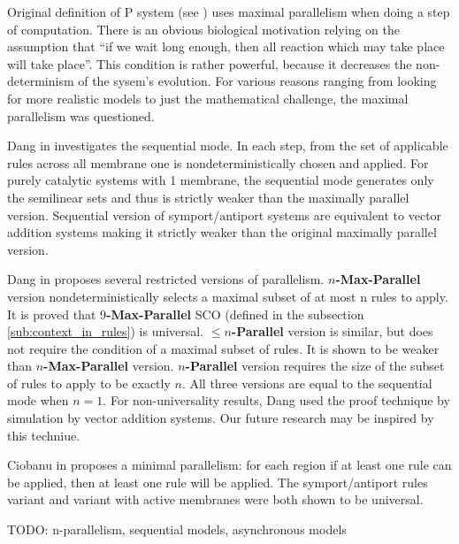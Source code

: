 Original definition of P system (see \cite{Paun98}) uses maximal parallelism when doing a step of computation. There is an obvious biological motivation relying on the assumption that ``if we wait long enough, then all reaction which may take place will take place''. This condition is rather powerful, because it decreases the non-determinism of the sysem's evolution. For various reasons ranging from looking for more realistic models to just the mathematical challenge, the maximal parallelism was questioned.


Dang in \cite{Dang04Sequential} investigates the sequential mode. In each step, from the set of applicable rules across all membrane one is nondeterministically chosen and applied. For purely catalytic systems with 1 membrane, the sequential mode generates only the semilinear sets and thus is strictly weaker than the maximally parallel version.
Sequential version of symport/antiport systems are equivalent to vector addition systems making it strictly weaker than the original maximally parallel version.



Dang in \cite{Ibarra04dang} proposes several restricted versions of parallelism.
$n${\bf -Max-Parallel} version nondeterministically selects a maximal subset of at most n rules to apply. It is proved that 9{\bf -Max-Parallel} SCO (defined in the subsection \ref{sub:context_in_rules}) is universal.
$\leq n${\bf -Parallel} version is similar, but does not require the condition of a maximal subset of rules. It is shown to be weaker than $n${\bf -Max-Parallel} version.
$n${\bf -Parallel} version requires the size of the subset of rules to apply to be exactly $n$.
All three versions are equal to the sequential mode when $n=1$. For non-universality results, Dang used the proof technique by simulation by vector addition systems. Our future research may be inspired by this techniue.


Ciobanu in \cite{Ciobanu:2007:MinimalParallelism} proposes a minimal parallelism: for each region if at least one rule can be applied, then at least one rule will be applied. The symport/antiport rules variant and variant with active membranes were both shown to be universal.

TODO: n-parallelism, sequential models, asynchronous models

